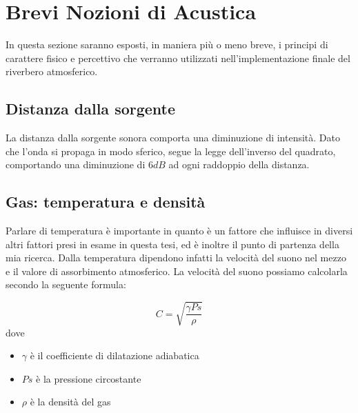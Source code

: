 \section{Brevi Nozioni di Acustica}

In questa sezione saranno esposti, in maniera più o meno breve, i principi di
carattere fisico e percettivo che verranno utilizzati nell'implementazione
finale del riverbero atmosferico.


\subsection{Distanza dalla sorgente}

La distanza dalla sorgente sonora comporta una diminuzione di intensità. Dato
che l’onda si propaga in modo sferico, segue la legge dell’inverso del quadrato,
comportando una diminuzione di $6dB$ ad ogni raddoppio della distanza.

\subsection{Gas: temperatura e densità}

Parlare di temperatura è importante in quanto è un fattore che influisce in
diversi altri fattori presi in esame in questa tesi, ed è inoltre il punto di
partenza della mia ricerca. Dalla temperatura dipendono infatti la velocità del
suono nel mezzo e il valore di assorbimento atmosferico. La velocità del suono
possiamo calcolarla secondo la seguente formula:

\begin{equation}
C=\sqrt{\frac{\gamma Ps}{\rho}}
\end{equation}
dove

\begin{itemize}
      \item $\gamma$ è il coefficiente di dilatazione adiabatica
      \item $Ps$ è la pressione circostante
      \item $\rho$ è la densità del gas
\end{itemize}

